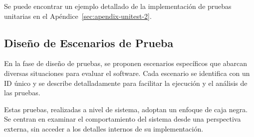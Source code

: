 Se puede encontrar un ejemplo detallado de la implementación de pruebas unitarias en el Apéndice~\ref{sec:apendix-unitest-2}.

\subsection{Diseño de Escenarios de Prueba}
En la fase de diseño de pruebas, se proponen escenarios específicos que abarcan diversas situaciones para evaluar el software. Cada escenario se identifica con un ID único y se describe detalladamente para facilitar la ejecución y el análisis de las pruebas.

Estas pruebas, realizadas a nivel de sistema, adoptan un enfoque de caja negra. Se centran en examinar el comportamiento del sistema desde una perspectiva externa, sin acceder a los detalles internos de su implementación. 



